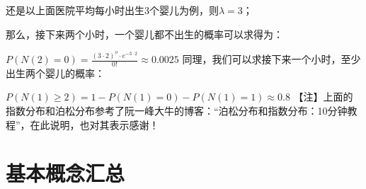 \documentclass[11pt]{book}
\newcounter{#2}
\newcounter{#2}[#1]
\numberwithin{#2}{#1}
\begin{document}
还是以上面医院平均每小时出生3个婴儿为例，则$ \lambda =3 $；

那么，接下来两个小时，一个婴儿都不出生的概率可以求得为：

$ P\left( N\left(2 \right) =0 \right) =\frac{\left( 3\cdot 2 \right) ^{o} \cdot e^{-3\cdot 2} }{0!} \approx 0.0025 $
同理，我们可以求接下来一个小时，至少出生两个婴儿的概率：

$ P\left( N\left( 1 \right) \geq 2 \right) =1-P\left( N\left( 1 \right)=0  \right) - P\left( N\left( 1 \right)=1  \right)\approx 0.8 $
【注】上面的指数分布和泊松分布参考了阮一峰大牛的博客：“泊松分布和指数分布：10分钟教程”，在此说明，也对其表示感谢！





	\chapter{基本概念汇总}
\end{document}

